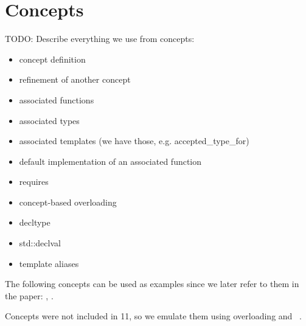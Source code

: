 \section{\Cpp{} Concepts} %
\label{sec:prelim}

TODO: Describe everything we use from concepts:

\begin{itemize}
\item concept definition
\item refinement of another concept
\item associated functions
\item associated types
\item associated templates (we have those, e.g. accepted\_type\_for)
\item default implementation of an associated function
\item requires
\item concept-based overloading
\item decltype
\item std::declval
\item template aliases
\end{itemize}

The following concepts can be used as examples since we later refer to them in 
the paper: , .

Concepts were not included in \Cpp{}11, so we emulate them using overloading and 
~\cite{jarvi:03:cuj_arbitrary_overloading}.
